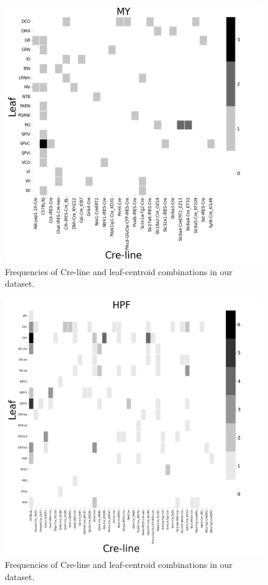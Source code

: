 \begin{figure}[H]
    \centering
    \includegraphics[width = 7in]{figs/MY centroid density.png} 
    \caption{Frequencies of Cre-line and leaf-centroid combinations in our dataset.}
    \label{fig:my_label}
\end{figure}
\newpage

\begin{figure}[H]
    \centering
    \includegraphics[width = 7in]{figs/HPF centroid density.png} 
    \caption{Frequencies of Cre-line and leaf-centroid combinations in our dataset.}
    \label{fig:my_label}
\end{figure}
\newpage

